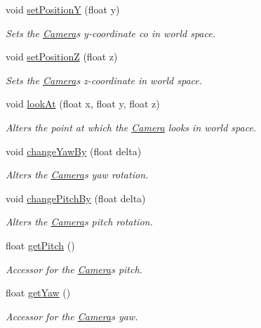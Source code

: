 \begin{DoxyCompactItemize}
void \hyperlink{classtsgl_1_1_camera_aa4b72d96ba1d802c6940fdd8f9f7f472}{set\+PositionY} (float y)
\begin{DoxyCompactList}\small\item\em Sets the \hyperlink{classtsgl_1_1_camera}{Camera}\textquotesingle{}s y-\/coordinate co in world space. \end{DoxyCompactList}\item 
void \hyperlink{classtsgl_1_1_camera_a87c83395dbde5a8fce49cba5200a0a5c}{set\+PositionZ} (float z)
\begin{DoxyCompactList}\small\item\em Sets the \hyperlink{classtsgl_1_1_camera}{Camera}\textquotesingle{}s z-\/coordinate in world space. \end{DoxyCompactList}\item 
void \hyperlink{classtsgl_1_1_camera_a3228e5545b7f20bc39282ea9267acfda}{look\+At} (float x, float y, float z)
\begin{DoxyCompactList}\small\item\em Alters the point at which the \hyperlink{classtsgl_1_1_camera}{Camera} looks in world space. \end{DoxyCompactList}\item 
void \hyperlink{classtsgl_1_1_camera_ade60f005d962cde8397ea080251eba93}{change\+Yaw\+By} (float delta)
\begin{DoxyCompactList}\small\item\em Alters the \hyperlink{classtsgl_1_1_camera}{Camera}\textquotesingle{}s yaw rotation. \end{DoxyCompactList}\item 
void \hyperlink{classtsgl_1_1_camera_af8df38d9efb33604af16c13e2a8446e0}{change\+Pitch\+By} (float delta)
\begin{DoxyCompactList}\small\item\em Alters the \hyperlink{classtsgl_1_1_camera}{Camera}\textquotesingle{}s pitch rotation. \end{DoxyCompactList}\item 
float \hyperlink{classtsgl_1_1_camera_a73756ae570553923c70a084c11f1d225}{get\+Pitch} ()
\begin{DoxyCompactList}\small\item\em Accessor for the \hyperlink{classtsgl_1_1_camera}{Camera}\textquotesingle{}s pitch. \end{DoxyCompactList}\item 
float \hyperlink{classtsgl_1_1_camera_ae66ea7ccf619657cf817e70c934a3d36}{get\+Yaw} ()
\begin{DoxyCompactList}\small\item\em Accessor for the \hyperlink{classtsgl_1_1_camera}{Camera}\textquotesingle{}s yaw. \end{DoxyCompactList}\item 

\end{DoxyCompactItemize}
